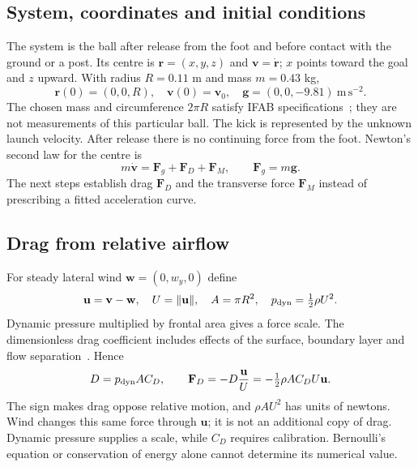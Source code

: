 \documentclass[11pt,a4paper]{article}
\begin{document}
\subsection{System, coordinates and initial conditions}
The system is the ball after release from the foot and before contact with the ground or a post. Its centre is $\mathbf r=(x,y,z)$ and $\mathbf v=\dot{\mathbf r}$; $x$ points toward the goal and $z$ upward. With radius $R=0.11$ m and mass $m=0.43$ kg,
\begin{equation}
\mathbf r(0)=(0,0,R),\quad \mathbf v(0)=\mathbf v_0,\quad
\mathbf g=(0,0,-9.81)\ \mathrm{m\,s^{-2}}.
\end{equation}
The chosen mass and circumference $2\pi R$ satisfy IFAB specifications~\cite{ifab}; they are not measurements of this particular ball. The kick is represented by the unknown launch velocity. After release there is no continuing force from the foot. Newton's second law for the centre is
\begin{equation}
m\dot{\mathbf v}=\mathbf F_g+\mathbf F_D+\mathbf F_M,\qquad\mathbf F_g=m\mathbf g.
\label{eq:newton}
\end{equation}
The next steps establish drag $\mathbf F_D$ and the transverse force $\mathbf F_M$ instead of prescribing a fitted acceleration curve.
\subsection{Drag from relative airflow}
For steady lateral wind $\mathbf w=(0,w_y,0)$ define
\begin{equation}
\mathbf u=\mathbf v-\mathbf w,\quad U=\|\mathbf u\|,\quad A=\pi R^2,\quad p_{\rm dyn}=\tfrac12\rho U^2.
\end{equation}
Dynamic pressure multiplied by frontal area gives a force scale. The dimensionless drag coefficient includes effects of the surface, boundary layer and flow separation~\cite{nasa}. Hence
\begin{equation}
D=p_{\rm dyn}AC_D,\qquad\mathbf F_D=-D\frac{\mathbf u}{U}
=-\tfrac12\rho AC_DU\mathbf u.
\label{eq:drag}
\end{equation}
The sign makes drag oppose relative motion, and $\rho AU^2$ has units of newtons. Wind changes this same force through $\mathbf u$; it is not an additional copy of drag. Dynamic pressure supplies a scale, while $C_D$ requires calibration. Bernoulli's equation or conservation of energy alone cannot determine its numerical value.
\end{document}
